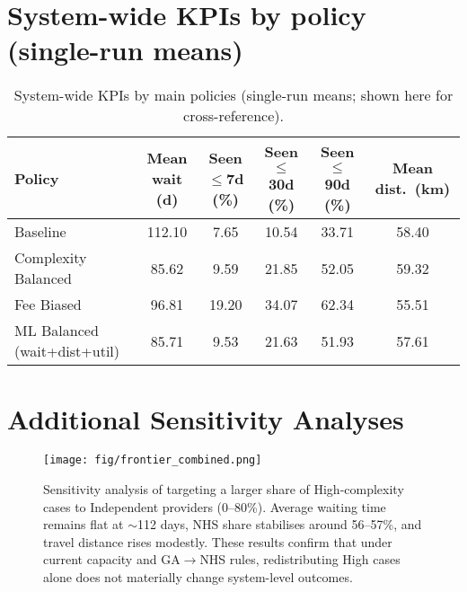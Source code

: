 \documentclass[ %
                    author={Nattanan Nawakitbamrung},
                supervisor={Dr. Sébastien Rochat},
                    degree={MSc},
                     title={Developing and Evaluating the Impact of a Single Patient Treatment List (PTL) for an NHS Integrated Care System},
                  subtitle={},
                      type={},
                      year={2025}]{dissertation}
\begin{document}
\section{System-wide KPIs by policy (single-run means)}
\begin{table}[h!]
\centering
\footnotesize
\setlength{\tabcolsep}{4pt}
\begin{adjustbox}{width=\linewidth}
\begin{tabular}{lccccc}
\toprule
\textbf{Policy} & \textbf{Mean wait (d)} & \textbf{Seen$\le$7d (\%)} &
\textbf{Seen$\le$30d (\%)} & \textbf{Seen$\le$90d (\%)} & \textbf{Mean dist.\ (km)} \\
\midrule
Baseline & 112.10 & 7.65 & 10.54 & 33.71 & 58.40 \\
Complexity Balanced & 85.62 & 9.59 & 21.85 & 52.05 & 59.32 \\
Fee Biased & 96.81 & 19.20 & 34.07 & 62.34 & 55.51 \\
ML Balanced (wait+dist+util) & 85.71 & 9.53 & 21.63 & 51.93 & 57.61 \\
\bottomrule
\end{tabular}
\end{adjustbox}
\caption{System-wide KPIs by main policies (single-run means; shown here for cross-reference).}
\label{tab:app-sys-kpi-main}
\end{table}

\clearpage
\section{Additional Sensitivity Analyses}
\begin{figure}[htbp]
    \centering
    \texttt{[image: fig/frontier\_combined.png]}
    \caption{Sensitivity analysis of targeting a larger share of High-complexity cases to Independent providers (0–80\%). 
    Average waiting time remains flat at $\sim$112 days, NHS share stabilises around 56–57\%, and travel distance rises modestly. 
    These results confirm that under current capacity and GA$\rightarrow$NHS rules, redistributing High cases alone does not materially change system-level outcomes.}
    \label{fig:high-to-private-sensitivity}
\end{figure}
\end{document}
